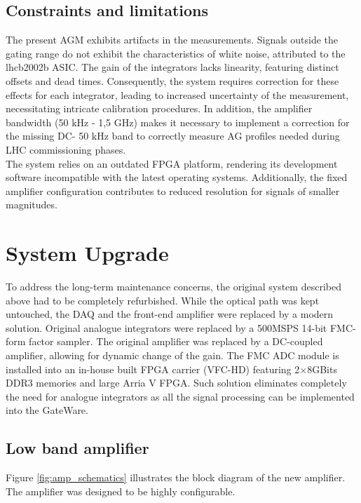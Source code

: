 \subsection{Constraints and limitations}
The present AGM exhibits artifacts in the measurements. Signals outside the gating range do not exhibit the characteristics of white noise, attributed to the lhcb2002b ASIC. The gain of the integrators lacks linearity, featuring distinct offsets and dead times. Consequently, the system requires correction for these effects for each integrator, leading to increased uncertainty of the measurement, necessitating intricate calibration procedures. In addition, the amplifier bandwidth (50 kHz - 1,5 GHz) makes it necessary to implement a correction for the missing DC- 50 kHz band to correctly measure AG profiles needed during LHC commissioning phases.\\
The system relies on an outdated FPGA platform, rendering its development
software incompatible with the latest operating systems. Additionally, the fixed amplifier configuration contributes to reduced resolution for signals of smaller magnitudes.

\section{System Upgrade}
To address the long-term maintenance concerns, the original system described above had to be completely refurbished. While the optical path was kept untouched, the DAQ and the front-end amplifier were replaced by a modern solution. Original analogue integrators were replaced by a 500MSPS 14-bit FMC-form factor sampler. The original amplifier was replaced by a DC-coupled amplifier, allowing for dynamic change of the gain. The FMC ADC module is installed into an in-house built FPGA carrier (VFC-HD) featuring 2$\times 8$GBits DDR3 memories and large Arria V FPGA.  Such solution eliminates completely the need for analogue integrators as all the signal processing can be implemented into the GateWare.  

\subsection{Low band amplifier}

Figure \ref{fig:amp_schematics} illustrates the block diagram of the new amplifier. The amplifier was designed to be highly configurable.

